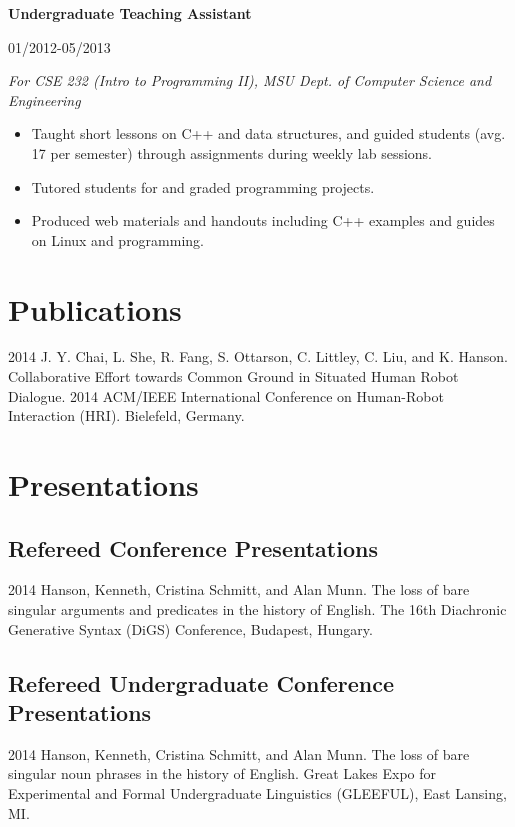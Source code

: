 \documentclass[10pt,oneside]{article}
\newcommand{\ressection}[1]{
	\vspace{-12pt}
	\section*{#1}
}
\newcommand{\ressubsection}[1]{
	\subsection*{#1}
	\vspace{-4pt}
}
\newcommand{\resbigitem}[4]{
	\item \parbox[t]{0.8\textwidth}{\textbf{#1}} \hfill #2 \\
		\parbox[t]{0.8\textwidth}{\textit{#3}} \hfill \textit{#4}
}
\begin{document}
\begin{reslist}
	\resbigitem{Undergraduate Teaching Assistant}
		{01/2012-05/2013}
		{For CSE 232 (Intro to Programming II), MSU Dept. of Computer Science and Engineering}
		{}
	\begin{itemize}
		\item Taught short lessons on C++ and data structures, and guided students (avg. 17 per semester) through assignments during weekly lab sessions.
		\item Tutored students for and graded programming projects.
		\item Produced web materials and handouts including C++ examples and guides on Linux and programming.
	\end{itemize}
\end{reslist}


\ressection{Publications}

\begin{publist}
	\item[2014] {J. Y. Chai, L. She, R. Fang, S. Ottarson, C. Littley, C. Liu, and K. Hanson. Collaborative Effort towards Common Ground in Situated Human Robot Dialogue. 2014 ACM/IEEE International Conference on Human-Robot Interaction (HRI). Bielefeld, Germany.}
\end{publist}


\ressection{Presentations}

\ressubsection{Refereed Conference Presentations}
\begin{publist}
	\item[2014] {Hanson, Kenneth, Cristina Schmitt, and Alan Munn. The loss of bare singular arguments and predicates in the history of English. The 16th Diachronic Generative Syntax (DiGS) Conference, Budapest, Hungary.}
\end{publist}

\ressubsection{Refereed Undergraduate Conference Presentations}
\begin{publist}
	\item[2014] {Hanson, Kenneth, Cristina Schmitt, and Alan Munn. The loss of bare singular noun phrases in the history of English. Great Lakes Expo for Experimental and Formal Undergraduate Linguistics (GLEEFUL), East Lansing, MI.}
\end{publist}
\end{document}
